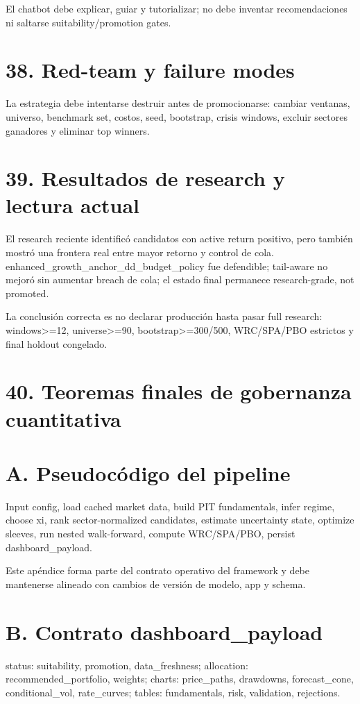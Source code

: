 \documentclass[11pt,letterpaper]{article}
\begin{document}
El chatbot debe explicar, guiar y tutorializar; no debe inventar recomendaciones ni saltarse suitability/promotion gates.

\section{38. Red-team y failure modes}
La estrategia debe intentarse destruir antes de promocionarse: cambiar ventanas, universo, benchmark set, costos, seed, bootstrap, crisis windows, excluir sectores ganadores y eliminar top winners.

\section{39. Resultados de research y lectura actual}
El research reciente identificó candidatos con active return positivo, pero también mostró una frontera real entre mayor retorno y control de cola. enhanced\_growth\_anchor\_dd\_budget\_policy fue defendible; tail-aware no mejoró sin aumentar breach de cola; el estado final permanece research-grade, not promoted.

La conclusión correcta es no declarar producción hasta pasar full research: windows>=12, universe>=90, bootstrap>=300/500, WRC/SPA/PBO estrictos y final holdout congelado.

\section{40. Teoremas finales de gobernanza cuantitativa}
\section{A. Pseudocódigo del pipeline}
Input config, load cached market data, build PIT fundamentals, infer regime, choose xi, rank sector-normalized candidates, estimate uncertainty state, optimize sleeves, run nested walk-forward, compute WRC/SPA/PBO, persist dashboard\_payload.

Este apéndice forma parte del contrato operativo del framework y debe mantenerse alineado con cambios de versión de modelo, app y schema.

\section{B. Contrato dashboard\_payload}
status: suitability, promotion, data\_freshness; allocation: recommended\_portfolio, weights; charts: price\_paths, drawdowns, forecast\_cone, conditional\_vol, rate\_curves; tables: fundamentals, risk, validation, rejections.
\end{document}
